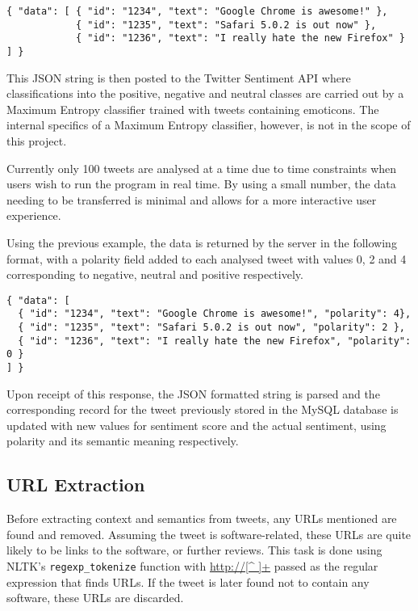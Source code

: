 \begin{verbatim}
{ "data": [ { "id": "1234", "text": "Google Chrome is awesome!" },
            { "id": "1235", "text": "Safari 5.0.2 is out now" },
            { "id": "1236", "text": "I really hate the new Firefox" } ] }
\end{verbatim}

This JSON string is then posted to the Twitter Sentiment API where classifications into the positive, negative and neutral classes are carried out by a Maximum Entropy classifier trained with tweets containing emoticons. The internal specifics of a Maximum Entropy classifier, however, is not in the scope of this project. %

Currently only 100 tweets are analysed at a time due to time constraints when users wish to run the program in real time. By using a small number, the data needing to be transferred is minimal and allows for a more interactive user experience.

Using the previous example, the data is returned by the server in the following format, with a polarity field added to each analysed tweet with values 0, 2 and 4 corresponding to negative, neutral and positive respectively.
\begin{verbatim}
{ "data": [ 
  { "id": "1234", "text": "Google Chrome is awesome!", "polarity": 4},
  { "id": "1235", "text": "Safari 5.0.2 is out now", "polarity": 2 },
  { "id": "1236", "text": "I really hate the new Firefox", "polarity": 0 } 
] }
\end{verbatim}

Upon receipt of this response, the JSON formatted string is parsed and the corresponding record for the tweet previously stored in the MySQL database is updated with new values for sentiment score and the actual sentiment, using polarity and its semantic meaning respectively.

\subsection{URL Extraction}
Before extracting context and semantics from tweets, any URLs mentioned are found and removed. Assuming the tweet is software-related, these URLs are quite likely to be links to the software, or further reviews. This task is done using NLTK's \texttt{regexp\_tokenize} function with \url{http://[^ ]+} passed as the regular expression that finds URLs. If the tweet is later found not to contain any software, these URLs are discarded.

